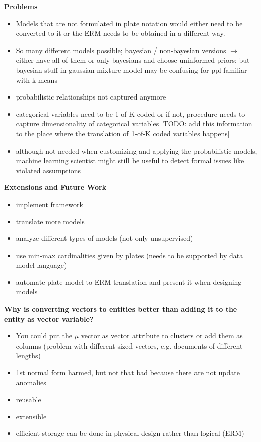 \textbf{Problems}
\begin{itemize}
\item Models that are not formulated in plate notation would either need to be converted to it or the ERM needs to be obtained in a different way.
\item So many different models possible; bayesian / non-bayesian versions $\rightarrow$ either have all of them or only bayesians and choose uninformed priors; but bayesian stuff in gaussian mixture model may be confusing for ppl familiar with k-means
\item probabilistic relationships not captured anymore
\item categorical variables need to be 1-of-K coded or if not, procedure needs to capture dimensionality of categorical variables [TODO: add this information to the place where the translation of 1-of-K coded variables happens]
\item although not needed when customizing and applying the probabilistic models, machine learning scientist might still be useful to detect formal issues like violated assumptions
\end{itemize}

\textbf{Extensions and Future Work}
\begin{itemize}
\item implement framework
\item translate more models
\item analyze different types of models (not only unsupervised)
\item use min-max cardinalities given by plates (needs to be supported by data model language)
\item automate plate model to ERM translation and present it when designing models
\end{itemize}

\textbf{Why is converting vectors to entities better than adding it to the entity as vector variable?}
\begin{itemize}
\item You could put the $\mu$ vector as vector attribute to clusters or add them as columns (problem with different sized vectors, e.g. documents of different lengths)
\item 1st normal form harmed, but not that bad because there are not update anomalies
\item reusable
\item extensible
\item efficient storage can be done in physical design rather than logical (ERM)
\end{itemize}

